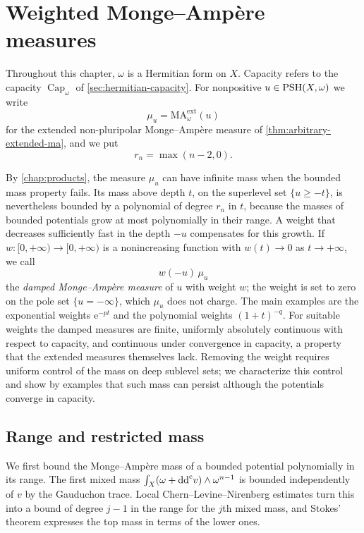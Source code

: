 \chapter{Weighted Monge--Amp\`ere measures}
\label{chap:damped-measures}

Throughout this chapter, $\omega$ is a Hermitian form on $X$. Capacity refers to the capacity $\operatorname{Cap}_\omega$ of \cref{sec:hermitian-capacity}. For nonpositive $u\in\mathrm{PSH}(X,\omega)$ we write
\[
 \mu_u=\mathrm{MA}^{\mathrm{ext}}_\omega(u)
\]
for the extended non-pluripolar Monge--Amp\`ere measure of \cref{thm:arbitrary-extended-ma}, and we put
\[
 r_n=\max(n-2,0).
\]

By \cref{chap:products}, the measure $\mu_u$ can have infinite mass when the bounded mass property fails. Its mass above depth $t$, on the superlevel set $\{u\geq-t\}$, is nevertheless bounded by a polynomial of degree $r_n$ in $t$, because the masses of bounded potentials grow at most polynomially in their range. A weight that decreases sufficiently fast in the depth $-u$ compensates for this growth. If $w\colon[0,+\infty)\to[0,+\infty)$ is a nonincreasing function with $w(t)\to0$ as $t\to+\infty$, we call
\[
 w(-u)\,\mu_u
\]
the \emph{damped Monge--Amp\`ere measure} of $u$ with weight $w$; the weight is set to zero on the pole set $\{u=-\infty\}$, which $\mu_u$ does not charge. The main examples are the exponential weights $\mathrm{e}^{-pt}$ and the polynomial weights $(1+t)^{-q}$. For suitable weights the damped measures are finite, uniformly absolutely continuous with respect to capacity, and continuous under convergence in capacity, a property that the extended measures themselves lack. Removing the weight requires uniform control of the mass on deep sublevel sets; we characterize this control and show by examples that such mass can persist although the potentials converge in capacity.

\section{Range and restricted mass}

We first bound the Monge--Amp\`ere mass of a bounded potential polynomially in its range. The first mixed mass $\int_X(\omega+\mathrm{dd}^{\mathrm{c}} v)\wedge\omega^{n-1}$ is bounded independently of $v$ by the Gauduchon trace. Local Chern--Levine--Nirenberg estimates turn this into a bound of degree $j-1$ in the range for the $j$th mixed mass, and Stokes' theorem expresses the top mass in terms of the lower ones.

